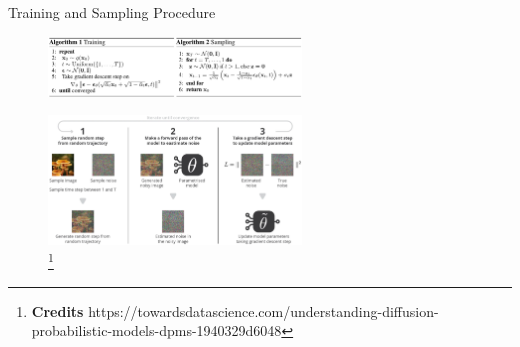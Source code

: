 \documentclass[aspectratio=169, 9pt]{beamer}
\theoremstyle{definition}
\begin{document}
\begin{frame}{Training and Sampling Procedure}
  \begin{figure}[h!]
    \centering
    \includegraphics[width=0.6\textwidth]{./pic/ho_algo.png}
  \end{figure}
  \begin{figure}[h]
    \centering
    \includegraphics[width=0.60\textwidth]{./pic/ho_training.png}
    \caption{\footnote{\textbf{Credits}
    https://towardsdatascience.com/understanding-diffusion-probabilistic-models-dpms-1940329d6048}}
  \end{figure}
\end{frame}
\end{document}
